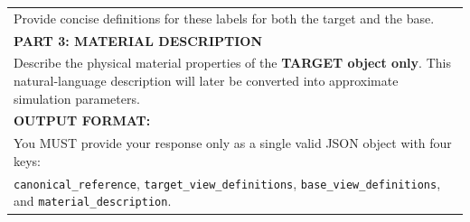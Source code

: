 \begin{center}
\begin{tabularx}{\linewidth}{X}
Provide concise definitions for these labels for both the target and the base. \\

\textbf{PART 3: MATERIAL DESCRIPTION} \\
Describe the physical material properties of the \textbf{TARGET object only}. This natural-language description will later be converted into approximate simulation parameters. \\

\textbf{OUTPUT FORMAT:} \\
You MUST provide your response only as a single valid JSON object with four keys: \\
\texttt{canonical\_reference}, \texttt{target\_view\_definitions}, \texttt{base\_view\_definitions}, and \texttt{material\_description}. \\
\bottomrule
\end{tabularx}
\end{center}

